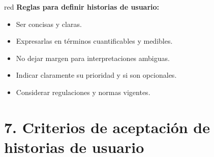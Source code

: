 \documentclass[
11pt, %
]{charter}
\begin{document}
\begin{consigna}{red}
\textbf{Reglas para definir historias de usuario:}
\begin{itemize}
  \item Ser concisas y claras.
  \item Expresarlas en términos cuantificables y medibles.
  \item No dejar margen para interpretaciones ambiguas.
  \item Indicar claramente su prioridad y si son opcionales.
  \item Considerar regulaciones y normas vigentes.
\end{itemize}

\end{consigna} %


\section{7. Criterios de aceptación de historias de usuario}
\label{sec:criteriosAceptacion}
\end{document}
